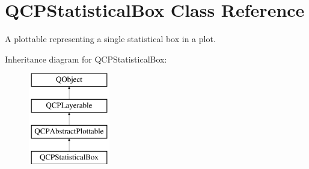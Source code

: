 \hypertarget{class_q_c_p_statistical_box}{}\section{Q\+C\+P\+Statistical\+Box Class Reference}
\label{class_q_c_p_statistical_box}


A plottable representing a single statistical box in a plot.  


Inheritance diagram for Q\+C\+P\+Statistical\+Box\+:\begin{figure}[H]
\begin{center}
\leavevmode
\includegraphics[height=4.000000cm]{class_q_c_p_statistical_box}
\end{center}
\end{figure}
